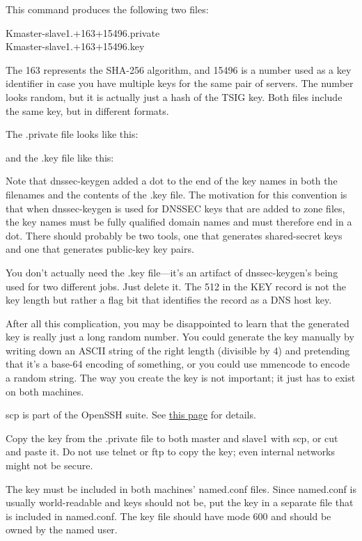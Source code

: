 This command produces the following two files:

{ Kmaster-slave1.+163+15496.private }\\
{Kmaster-slave1.+163+15496.key}

The {163} represents the SHA-256 algorithm, and {15496} is a number used
as a key identifier in case you have multiple keys for the same pair of
servers. The number looks random, but it is actually just a hash of the
TSIG key. Both files include the same key, but in different formats.

The {.private} file looks like this:


and the {.key} file like this:


Note that {dnssec-keygen} added a dot to the end of the key names in
both the filenames and the contents of the {.key} file. The motivation
for this convention is that when {dnssec-keygen} is used for DNSSEC keys
that are added to zone files, the key names must be fully qualified
domain names and must therefore end in a dot. There should probably be
two tools, one that generates shared-secret keys and one that generates
public-key key pairs.

You don't actually need the {.key} file---it's an artifact of
{dnssec-keygen}'s being used for two different jobs. Just delete it. The
512 in the KEY record is not the key length but rather a flag bit that
identifies the record as a DNS host key.

After all this complication, you may be disappointed to learn that the
generated key is really just a long random number. You could generate
the key manually by writing down an ASCII string of the right length
(divisible by 4) and pretending that it's a base-64 encoding of
something, or you could use {mmencode} to encode a random string. The
way you create the key is not important; it just has to exist on both
machines.

\leavevmode\hypertarget{part0024_split_058.htmlux5cux23_idContainer1032}{}%
{scp} is part of the OpenSSH suite. See
\protect\hyperlink{part0037_split_047.htmlux5cux23_idTextAnchor1737}{this
page} for details.

Copy the key from the {.private} file to both master and slave1 with
{scp}, or cut and paste it. Do not use {telnet} or {ftp} to copy the
key; even internal networks might not be secure.

The key must be included in both machines' {named.conf} files. Since
{named.conf} is usually world-readable and keys should not be, put the
key in a separate file that is included in {named.conf}. The key file
should have mode 600 and should be owned by the {named} user.

